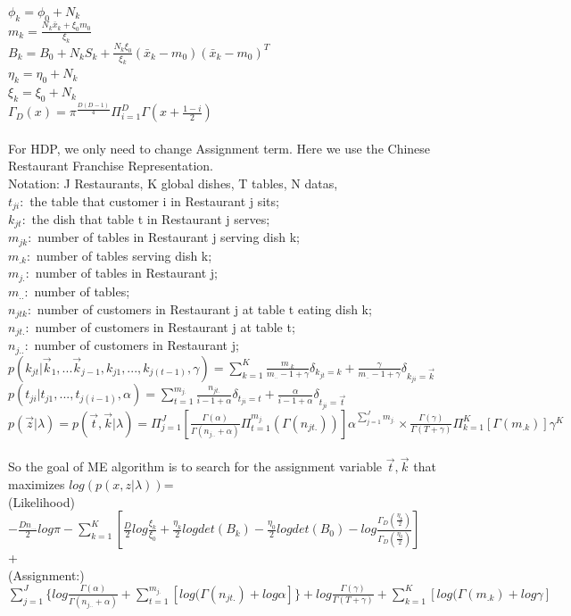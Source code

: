 \documentclass{article}
\begin{document}
$\phi_{k}=\phi_{0}+N_{k}$\\
$m_{k}=\frac{N_{k}\bar x_{k}+\xi_{0}m_{0}}{\xi_{k}}$\\
$B_{k}=B_{0}+N_{k}S_{k}+\frac{N_{k}\xi_{0}}{\xi_{k}}(\bar x_{k}-m_{0})(\bar x_{k}-m_{0})^{T}$\\
$\eta_{k}=\eta_{0}+N_{k}$\\
$\xi_{k}=\xi_{0}+N_{k}$\\
$\Gamma_{D}(x)=\pi^{\frac{D(D-1)}{4}}\Pi_{i=1}^{D}\Gamma(x+\frac{1-i}{2})$ \\ \\
For HDP, we only need to change Assignment term. Here we use the Chinese Restaurant Franchise Representation.\\
Notation: J Restaurants, K global dishes, T tables, N datas,\\
$t_{ji}:$ the table that customer i in Restaurant j sits;\\
$k_{jt}:$ the dish that table t in Restaurant j serves;\\
$m_{jk}:$ number of tables in Restaurant j serving dish k;\\
$m_{.k}:$ number of tables serving dish k;\\
$m_{j.}:$ number of tables in Restaurant j;\\
$m_{..}:$ number of tables;\\
$n_{jtk}:$ number of customers in Restaurant j at table t eating dish k;\\
$n_{jt.}:$ number of customers in Restaurant j at table t;\\
$n_{j..}:$ number of customers in Restaurant j;\\
$p(k_{jt}|\vec k_{1},...\vec k_{j-1},k_{j1},...,k_{j(t-1)},\gamma)=\sum_{k=1}^{K}\frac{m_{.k}}{m_{..}-1+\gamma}\delta_{k_{jt}=k}+\frac{\gamma}{m_{..}-1+\gamma}\delta_{k_{ji}=\vec k}$\\ 
$p(t_{ji}|t_{j1},...,t_{j(i-1)},\alpha)=\sum_{t=1}^{m_{j.}}\frac{n_{jt.}}{i-1+\alpha}\delta_{t_{ji}=t}+\frac{\alpha}{i-1+\alpha}\delta_{t_{ji}=\vec t}$\\ 
$p(\vec z|\lambda)=p(\vec t,\vec k|\lambda)=\Pi_{j=1}^{J}[\frac{\Gamma(\alpha)}{\Gamma(n_{j..}+\alpha)}\Pi_{t=1}^{m_{j.}}(\Gamma(n_{jt.}))]\alpha^{\sum_{j=1}^{J}m_{j.}}
\times \frac{\Gamma(\gamma)}{\Gamma(T+\gamma)}\Pi_{k=1}^{K} [\Gamma(m_{.k})] \gamma^{K}$ \\ \\
So the goal of ME algorithm is to search for the assignment variable $\vec t,\vec k$ that maximizes
$log(p(x,z|\lambda))$=\\
(Likelihood)$-\frac{D n_{...}}{2}log\pi-\sum_{k=1}^{K} [\frac{D}{2}log\frac{\xi_{k}}{\xi_{0}}+\frac{\eta_{k}}{2}log det(B_{k})-\frac{\eta_{0}}{2}log det(B_{0})
-log \frac{\Gamma_{D}(\frac{\eta_{k}}{2})}{\Gamma_{D}(\frac{\eta_{0}}{2})}]$ \\ 
+\\
(Assignment:)$\sum_{j=1}^{J}\{log \frac{\Gamma(\alpha)}{\Gamma(n_{j..}+\alpha)}+\sum_{t=1}^{m_{j.}}[log(\Gamma(n_{jt.})+log \alpha]\}+
 log \frac{\Gamma(\gamma)}{\Gamma(T+\gamma)}+\sum_{k=1}^{K} [log(\Gamma(m_{.k})+log \gamma]$\\ \\
\end{document}
